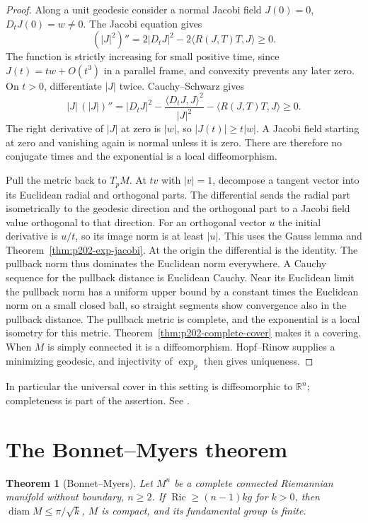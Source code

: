 \documentclass[11pt,oneside,openany]{book}
\theoremstyle{plain}
\newtheorem{theorem}{Theorem}[chapter]
\theoremstyle{definition}
\theoremstyle{remark}
\begin{document}
\begin{proof}
Along a unit geodesic consider a normal Jacobi field
\(J(0)=0\), \(D_tJ(0)=w\ne0\).
The Jacobi equation gives
\[
 (|J|^2)''=2|D_tJ|^2-2\langle R(J,T)T,J\rangle\ge0 .
\]
The function is strictly increasing for small positive
time, since \(J(t)=tw+O(t^3)\) in a parallel frame, and
convexity prevents any later zero. On \(t>0\), differentiate
\(|J|\) twice. Cauchy--Schwarz gives
\[
 |J|\, (|J|)''
 = |D_tJ|^2-\frac{\langle D_tJ,J\rangle^2}{|J|^2}
       -\langle R(J,T)T,J\rangle\ge0 .
\]
The right derivative of \(|J|\) at zero is \(|w|\), so
\(|J(t)|\ge t|w|\). A Jacobi field starting at zero and
vanishing again is normal unless it is zero. There are
therefore no conjugate times and the exponential is a
local diffeomorphism.

Pull the metric back to \(T_pM\). At \(tv\) with
\(|v|=1\), decompose a tangent vector into its Euclidean
radial and orthogonal parts. The differential sends the
radial part isometrically to the geodesic direction and
the orthogonal part to a Jacobi field value orthogonal
to that direction. For an orthogonal vector \(u\) the
initial derivative is \(u/t\), so its image norm is at
least \(|u|\). This uses the Gauss lemma and
Theorem~\ref{thm:p202-exp-jacobi}. At the origin the
differential is the identity. The pullback norm thus
dominates the Euclidean norm everywhere. A Cauchy
sequence for the pullback distance is Euclidean Cauchy.
Near its Euclidean limit the pullback norm has a uniform
upper bound by a constant times the Euclidean norm on
a small closed ball, so straight segments show convergence
also in the pullback distance. The pullback metric is
complete, and the exponential is a local isometry for
this metric. Theorem~\ref{thm:p202-complete-cover} makes
it a covering. When \(M\) is simply connected it is a
diffeomorphism. Hopf--Rinow supplies a minimizing geodesic,
and injectivity of \(\exp_p\) then gives uniqueness.
\end{proof}

In particular the universal cover in this setting is
diffeomorphic to \(\mathbb R^n\); completeness is part of
the assertion. See \cite[Chapter 12, Theorem 12.8]{LeeRM}.

\section{The Bonnet--Myers theorem}
\label{p202:G24}

\begin{theorem}[Bonnet--Myers]\label{thm:p202-bonnet-myers}
Let \(M^n\) be a complete connected Riemannian manifold
without boundary, \(n\ge2\). If
\(\operatorname{Ric}\ge(n-1)k g\) for \(k>0\), then
\(\operatorname{diam}M\le\pi/\sqrt{k}\), \(M\) is compact,
and its fundamental group is finite.
\end{theorem}
\end{document}
